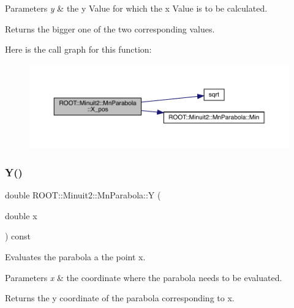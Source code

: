 \begin{DoxyParams}{Parameters}
{\em y} & the y Value for which the x Value is to be calculated.\\
\hline
\end{DoxyParams}
\begin{DoxyReturn}{Returns}
the bigger one of the two corresponding values. 
\end{DoxyReturn}
Here is the call graph for this function\+:
\nopagebreak
\begin{figure}[H]
\begin{center}
\leavevmode
\includegraphics[width=350pt]{db/d7d/classROOT_1_1Minuit2_1_1MnParabola_a2b4623df00488ca3d4175eb92123066e_cgraph}
\end{center}
\end{figure}
\mbox{\label{classROOT_1_1Minuit2_1_1MnParabola_af429c12e92f120e38f75147fd3fc857c}} 
\subsubsection{\texorpdfstring{Y()}{Y()}\hspace{0.1cm}{\footnotesize\ttfamily [1/2]}}
{\footnotesize\ttfamily double R\+O\+O\+T\+::\+Minuit2\+::\+Mn\+Parabola\+::Y (\begin{DoxyParamCaption}\item[{double}]{x }\end{DoxyParamCaption}) const\hspace{0.3cm}{\ttfamily [inline]}}

Evaluates the parabola a the point x.


\begin{DoxyParams}{Parameters}
{\em x} & the coordinate where the parabola needs to be evaluated.\\
\hline
\end{DoxyParams}
\begin{DoxyReturn}{Returns}
the y coordinate of the parabola corresponding to x. 
\end{DoxyReturn}
\mbox{\label{classROOT_1_1Minuit2_1_1MnParabola_af429c12e92f120e38f75147fd3fc857c}} 
